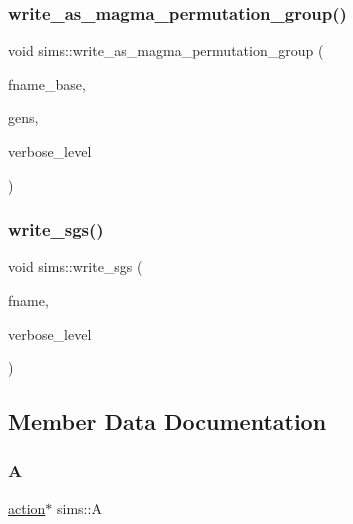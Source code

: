 \subsubsection{\texorpdfstring{write\+\_\+as\+\_\+magma\+\_\+permutation\+\_\+group()}{write\_as\_magma\_permutation\_group()}}
{\footnotesize\ttfamily void sims\+::write\+\_\+as\+\_\+magma\+\_\+permutation\+\_\+group (\begin{DoxyParamCaption}\item[{const \mbox{\hyperlink{galois_8h_ab6cc7b4aeb6ea31aba2b3fbfc83ff5e6}{B\+Y\+TE}} $\ast$}]{fname\+\_\+base,  }\item[{\mbox{\hyperlink{classvector__ge}{vector\+\_\+ge}} $\ast$}]{gens,  }\item[{\mbox{\hyperlink{galois_8h_a09fddde158a3a20bd2dcadb609de11dc}{I\+NT}}}]{verbose\+\_\+level }\end{DoxyParamCaption})}

\mbox{\label{classsims_a525dbabfc86ad1da634566d10b29c1c1}} 
\subsubsection{\texorpdfstring{write\+\_\+sgs()}{write\_sgs()}}
{\footnotesize\ttfamily void sims\+::write\+\_\+sgs (\begin{DoxyParamCaption}\item[{const \mbox{\hyperlink{galois_8h_ab6cc7b4aeb6ea31aba2b3fbfc83ff5e6}{B\+Y\+TE}} $\ast$}]{fname,  }\item[{\mbox{\hyperlink{galois_8h_a09fddde158a3a20bd2dcadb609de11dc}{I\+NT}}}]{verbose\+\_\+level }\end{DoxyParamCaption})}



\subsection{Member Data Documentation}
\mbox{\label{classsims_a3311c97dc08837220191985b1c7ee73f}} 
\subsubsection{\texorpdfstring{A}{A}}
{\footnotesize\ttfamily \mbox{\hyperlink{classaction}{action}}$\ast$ sims\+::A}

